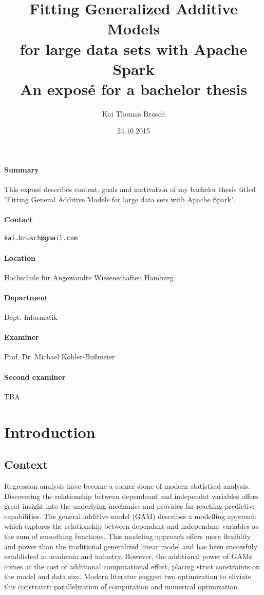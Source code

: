 \documentclass{article}
\title{
    Fitting Generalized Additive Models\\ for large data sets with Apache Spark \\[7pt]
    \large An exposé for a bachelor thesis
}
\date{24.10.2015}
\author{Kai Thomas Brusch}
\begin{document}

    \maketitle

    \paragraph{Summary}

    This exposé describes content, goals and motivation of my bachelor thesis titled "Fitting General Additive Models for large data sets with Apache Spark".

    \paragraph{Contact} \texttt{kai.brusch@gmail.com}

    \paragraph{Location} Hochschule für Angewandte Wissenschaften Hamburg
    \paragraph{Department} Dept. Informatik
    \paragraph{Examiner} Prof. Dr. Michael Köhler-Bußmeier
    \paragraph{Second examiner} TBA

    \newpage

    \tableofcontents

    \newpage

    \section{Introduction}

    \subsection{Context}
    Regression analysis have become a corner stone of modern statistical analysis. Discovering the relationship between dependeant and independat variables offers great insight into the underlying mechanics and provides far reaching predictive capabilities. The general additive model (GAM) describes a modelling approach which explores the relationship between dependant and independant variables as the sum of smoothing functions. This modeling approach offers more flexiblity and power than the traditional generalized linear model and has been succesfuly established in academia and industry. However, the additional power of GAMs comes at the cost of additional computational effort, placing strict constraints on the model and data size. Modern literatur suggest two optimization to eliviate this constraint: parallelization of computation and numerical optimization.
\end{document}
